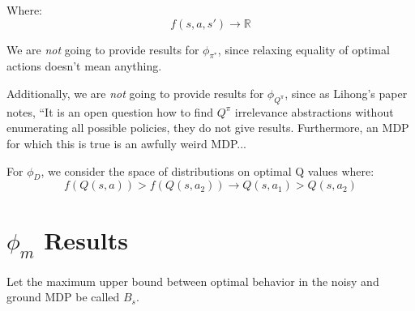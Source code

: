 \documentclass[11pt]{amsart}
\begin{document}
Where:
\begin{equation}
f(s,a,s') \rightarrow \mathbb{R}
\end{equation}


 We are {\it not} going to provide results for $\phi_{\pi^*}$, since relaxing equality of optimal actions doesn't mean anything.

 Additionally, we are {\it not} going to provide results for $\phi_{Q^\pi}$, since as Lihong's paper notes, ``It is an open question how to find $Q^\pi$ irrelevance abstractions without enumerating all possible policies, they do not give results. Furthermore, an MDP for which this is true is an awfully weird MDP...

 For $\phi_D$, we consider the space of distributions on optimal Q values where:
\begin{equation}
f(Q(s,a)) > f(Q(s,a_2)) \rightarrow Q(s,a_1) > Q(s,a_2)
\end{equation}

\newpage
\section{$\phi_{m}$ Results}

Let the maximum upper bound between optimal behavior in the noisy and ground MDP be called $B_s$.
\end{document}
